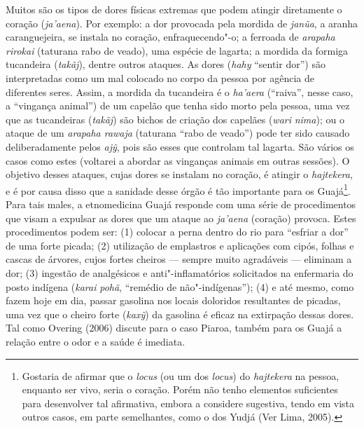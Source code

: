 Muitos são os tipos de dores físicas extremas que podem atingir
diretamente o coração (\emph{ja'aena}). Por exemplo: a dor provocada
pela mordida de \emph{janũa}, a aranha caranguejeira, se instala no
coração, enfraquecendo"-o; a ferroada de \emph{arapaha rirokai­}
(taturana rabo de veado), uma espécie de lagarta; a mordida da formiga
tucandeira (\emph{takãj}), dentre outros ataques. As dores (\emph{hahy}
``sentir dor'') são interpretadas como um mal colocado no corpo da pessoa
por agência de diferentes seres. Assim, a mordida da tucandeira é o
\emph{ha'aera} (``raiva'', nesse caso, a ``vingança animal'') de um capelão
que tenha sido morto pela pessoa, uma vez que as tucandeiras
(\emph{takãj}) são bichos de criação dos capelães (\emph{wari}
\emph{nima}); ou o ataque de um \emph{arapaha rawaja} (taturana ``rabo
de veado'') pode ter sido causado deliberadamente pelos \emph{ajỹ}, pois
são esses que controlam tal lagarta. São vários os casos como estes
(voltarei a abordar as vinganças animais em outras sessões). O objetivo
desses ataques, cujas dores se instalam no coração, é atingir o
\emph{hajtekera}, e é por causa disso que a sanidade desse órgão é tão
importante para os Guajá\footnote{Gostaria de afirmar que o \emph{locus}
  (ou um dos \emph{locus}) do \emph{hajtekera} na pessoa, enquanto ser
  vivo, seria o coração. Porém não tenho elementos suficientes para
  desenvolver tal afirmativa, embora a considere sugestiva, tendo em
  vista outros casos, em parte semelhantes, como o dos Yudjá (Ver Lima,
  2005).}. Para tais males, a etnomedicina Guajá responde com uma série
de procedimentos que visam a expulsar as dores que um ataque ao
\emph{ja'aena} (coração) provoca. Estes procedimentos podem ser: (1)
colocar a perna dentro do rio para ``esfriar a dor'' de uma forte picada;
(2) utilização de emplastros e aplicações com cipós, folhas e cascas de
árvores, cujos fortes cheiros --- sempre muito agradáveis --- eliminam a
dor; (3) ingestão de analgésicos e anti"-inflamatórios solicitados na
enfermaria do posto indígena (\emph{karai} \emph{pohã}, ``remédio de
não"-indígenas''); (4) e até mesmo, como fazem hoje em dia, passar
gasolina nos locais doloridos resultantes de picadas, uma vez que o
cheiro forte (\emph{kaxỹ}) da gasolina é eficaz na extirpação dessas
dores. Tal como Overing (2006) discute para o caso Piaroa, também para
os Guajá a relação entre o odor e a saúde é imediata.

